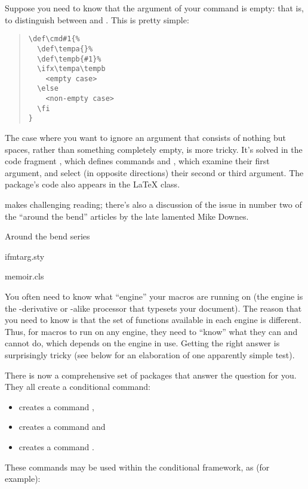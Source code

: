 
Suppose you need to know that the argument of your command is empty:
that is, to distinguish between  %
and .  This is pretty simple:
\begin{quote}
\begin{verbatim}
\def\cmd#1{%
  \def\tempa{}%
  \def\tempb{#1}%
  \ifx\tempa\tempb
    <empty case>
  \else
    <non-empty case>
  \fi
}
\end{verbatim}
\end{quote}
The case where you want to ignore an argument that consists of nothing
but spaces, rather than something completely empty, is more tricky.
It's solved in the code fragment , which defines
commands  and , which examine their
first argument, and select (in opposite directions) their second or
third argument.  The package's code also appears in the \LaTeX{}
 class.

 makes challenging reading; there's also a discussion of the
issue in number two of the ``around the bend'' articles by the late
lamented Mike Downes.
\begin{ctanrefs}
\item[\nothtml{\rmfamily}Around the bend series]
\item[ifmtarg.sty]
\item[memoir.cls]
\end{ctanrefs}


You often need to know what ``engine'' your macros are running on (the
engine is the \tex{}-derivative or \tex{}-alike processor that
typesets your document).  The reason that you need to know is that the
set of functions available in each engine is different.  Thus, for
\tex{} macros to run on any engine, they need to ``know'' what they
can and cannot do, which depends on the engine in use.  Getting the
right answer is surprisingly tricky (see below for an elaboration of
one apparently simple test).

There is now a comprehensive set of packages that answer the question
for you.  They all create a \tex{} conditional command:
\begin{itemize}
\item {} creates a command ,
\item {} creates a command  and
\item {} creates a command .
\end{itemize}
These \tex{} commands may be used within the \latex{} conditional
framework, as (for example):
\begin{quote}
  \texttt{\obracesymbol{}}\texttt{\cbracesymbol{}}\texttt{\obracesymbol{}}\texttt{\cbracesymbol{}}\texttt{\obracesymbol{}}\texttt{\cbracesymbol{}}
\end{quote}

